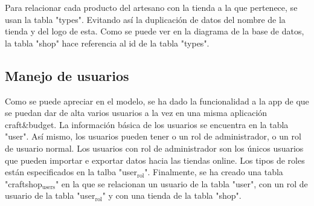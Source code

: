 \documentclass[11pt]{article}
\begin{document}
Para relacionar cada producto del artesano con la tienda a la que
pertenece, se usan la tabla "types". Evitando así la duplicación de
datos del nombre de la tienda y del logo de esta. Como se puede ver
en la diagrama de la base de datos, la tabla "shop" hace referencia
al id de la tabla "types".



\subsection{Manejo de usuarios}
\label{sec-2-3}
Como se puede apreciar en el modelo, se ha dado la funcionalidad a
la app de que se puedan dar de alta varios usuarios a la vez en una
misma aplicación craft\&budget. La información básica de los usuarios
se encuentra en la tabla "user". Así mismo, los usuarios pueden tener
o un rol de administrador, o un rol de usuario normal. Los usuarios
con rol de administrador son los únicos usuarios que pueden importar
e exportar datos hacia las tiendas online. Los tipos de roles están
especificados en la talba "user$_{\text{rol}}$". Finalmente, se ha creado una
tabla "craftshop$_{\text{users}}$" en la que se relacionan un usuario de la
tabla "user", con un rol de usuario de la tabla "user$_{\text{rol}}$" y con una
tienda de la tabla "shop".
\end{document}
